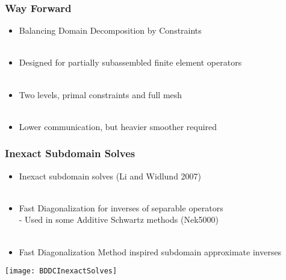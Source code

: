 \documentclass{beamer}
\begin{document}
\begin{frame}
\begin{center}
\frametitle{Way Forward}

\begin{itemize}

\item Balancing Domain Decomposition by Constraints\\

~\\

\item Designed for partially subassembled finite element operators\\

~\\

\item Two levels, primal constraints and full mesh\\

~\\

\item Lower communication, but heavier smoother required\\

\end{itemize}

\end{center}
\end{frame}

\begin{frame}
\begin{center}
\frametitle{Inexact Subdomain Solves}

\begin{itemize}

\item Inexact subdomain solves (Li and Widlund 2007)\\

~\\

\item Fast Diagonalization for inverses of separable operators\\
      - Used in some Additive Schwartz methods (Nek5000)\\

~\\

\item Fast Diagonalization Method inspired subdomain approximate inverses\\

\end{itemize}

\texttt{[image: BDDCInexactSolves]}

\end{center}
\end{frame}
\end{document}
